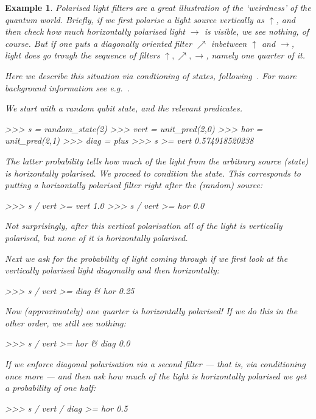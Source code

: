 \documentclass[leqno]{tufte-book} %
\newtheorem{example}[theorem]{Example}
\newcommand{\hairsp}{\hspace{1pt}} %
\newcommand{\eg}{\textit{e.\hairsp{}g.}\xspace} %
\begin{document}
\begin{example}
\label{ex:polarisation}
Polarised light filters are a great illustration of the `weirdness' of
the quantum world. Briefly, if we first polarise a
light source vertically as $\uparrow$, and then check how much
horizontally polarised light $\rightarrow$ is visible, we see nothing,
of course. But if one puts a diagonally oriented filter $\nearrow$
inbetween $\uparrow$ and $\rightarrow$, light does go trough the
sequence of filters $\uparrow, \nearrow, \rightarrow$, namely one
quarter of it.

Here we describe this situation via condtioning of states,
following~\cite{Jacobs15}. For more background information see
\eg~\cite{RieffelP11}.

We start with a random qubit state, and the relevant predicates.
\begin{python}
>>> s = random_state(2)
>>> vert = unit_pred(2,0)
>>> hor = unit_pred(2,1)
>>> diag = plus
>>> s >= vert
0.574918520238
\end{python}

\noindent The latter probability tells how much of the light from the
arbitrary source (state) is horizontally polarised.  We proceed to
condition the state. This corresponds to putting a horizontally
polarised filter right after the (random) source:
\begin{python}
>>> s / vert >= vert
1.0
>>> s / vert >= hor
0.0
\end{python}

\noindent Not surprisingly, after this vertical polarisation all of
the light is vertically polarised, but none of it is horizontally
polarised.

Next we ask for the probability of light coming through if we first
look at the vertically polarised light diagonally \emph{and then}
horizontally:
\begin{python}
>>> s / vert >= diag & hor
0.25
\end{python}

\noindent Now (approximately) one quarter is horizontally polarised!
If we do this in the other order, we still see nothing:
\begin{python}
>>> s / vert >= hor & diag
0.0
\end{python}

\noindent If we enforce diagonal polarisation via a second filter ---
that is, via conditioning once more --- and then ask how much of the
light is horizontally polarised we get a probability of one half:
\begin{python}
>>> s / vert / diag >= hor
0.5
\end{python}


\end{example}
\end{document}
